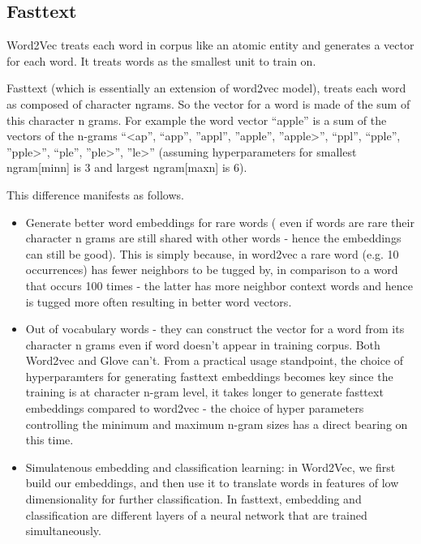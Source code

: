 \subsection{Fasttext}



Word2Vec treats each word in corpus like an atomic entity and generates a vector for each word. It treats words as the smallest unit to train on. 

Fasttext (which is essentially an extension of word2vec model), treats each word as composed of character ngrams. So the vector for a word is made of the sum of this character n grams. For example the word vector “apple” is a sum of the vectors of the n-grams “<ap”, “app”, ”appl”, ”apple”, ”apple>”, “ppl”, “pple”, ”pple>”, “ple”, ”ple>”, ”le>” (assuming hyperparameters for smallest ngram[minn] is 3 and largest ngram[maxn] is 6). 

This difference manifests as follows.

\begin{itemize}
	\item Generate better word embeddings for rare words ( even if words are rare their character n grams are still shared with other words - hence the embeddings can still be good).
	This is simply because, in word2vec a rare word (e.g. 10 occurrences) has fewer neighbors to be tugged by, in comparison to a word that occurs 100 times - the latter has more neighbor context words and hence is tugged more often resulting in better word vectors.

	\item Out of vocabulary words - they can construct the vector for a word from its character n grams even if word doesn't appear in training corpus. Both Word2vec and Glove can't.
	From a practical usage standpoint, the choice of hyperparamters for generating fasttext embeddings becomes key
	since the training is at character n-gram level, it takes longer to generate fasttext embeddings compared to word2vec - the choice of hyper parameters controlling the minimum and maximum n-gram sizes has a direct bearing on this time.

	\item Simulatenous embedding and classification learning: in Word2Vec, we first build our embeddings, and then use it to translate words in features of low dimensionality for further classification. In fasttext, embedding and classification are different layers of a neural network that are trained simultaneously.
\end{itemize}



